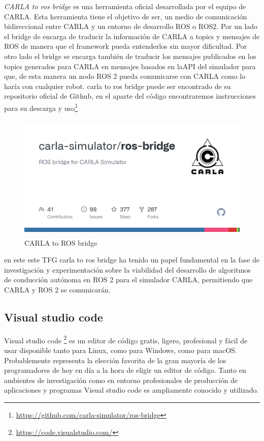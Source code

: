 \textit{CARLA to ros bridge} es una herramienta oficial desarrollada por el equipo de CARLA. Esta herramienta tiene el objetivo de ser,  un medio de comunicación bidireccional entre CARLA y un entorno de desarrollo ROS o ROS2. Por un lado el bridge de encarga de traducir la información de CARLA  a topics y mensajes de ROS de manera que el framework  pueda entenderlos sin mayor dificultad. Por otro lado el bridge se encarga también de traducir los mensajes publicados en los topics generados para CARLA en mensajes basados en la\ac{API} del simulador para que, de esta manera un nodo ROS 2 pueda comunicarse con CARLA como lo haría con cualquier robot. carla to ros bridge puede ser encontrado de su repositorio oficial de Github, en el aparte del código encontraremos instrucciones para su descarga y uso\footnote{\url{https://github.com/carla-simulator/ros-bridge}}
\begin{figure} [H]
	\begin{center}
	\includegraphics[height=6cm]{imagenes/cap3/carla_to_ros_bridge.png}
	\end{center}
	\caption[CARLA to ros bridge]{CARLA to ROS bridge}
	\label{fig:carla_to_ros_bridge}
\end{figure}
en este este \ac{TFG} carla to ros bridge ha tenido un papel fundamental  en la fase de investigación y experimentación sobre la viabilidad del desarrollo de algoritmos de conducción autónoma en ROS 2 para el simulador CARLA, permitiendo que CARLA y ROS 2 se comunicarán.


\subsection{Visual studio code}
\label{subsec:Visual studio code}

Visual studio code  \footnote{\url{https://code.visualstudio.com/}} es un editor de código gratis, ligero, profesional y fácil de usar disponible tanto para Linux, como para Windows, como para macOS. Probablemente representa la elección favorita de la gran mayoría de los programadores de hoy en día a la hora de eligir un editor de código. Tanto en ambientes de investigación como en entorno profesionales de producción de aplicaciones y programas Visual studio code es ampliamente conocido y utilizado.

